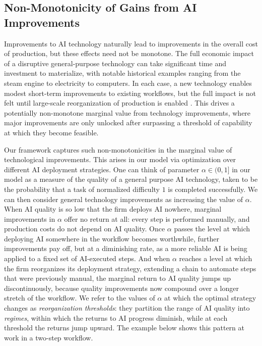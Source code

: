 \subsection{Non-Monotonicity of Gains from AI Improvements}
\label{sec:nonlinear}

Improvements to AI technology naturally lead to improvements in the overall cost of production, but these effects need not be monotone.
The full economic impact of a disruptive general-purpose technology can take significant time and investment to materialize, with notable historical examples ranging from the steam engine to electricity to computers.
In each case, a new technology enables modest short-term improvements to existing workflows, but the full impact is not felt until large-scale reorganization of production is enabled \citep{brynjolfsson2021productivity}.
This drives a potentially non-monotone marginal value from technology improvements, where major improvements are only unlocked after surpassing a threshold of capability at which they become feasible.

Our framework captures such non-monotonicities in the marginal value of technological improvements.
This arises in our model via optimization over different AI deployment strategies.
One can think of parameter $\alpha \in (0,1]$ in our model as a measure of the quality of a general purpose AI technology, taken to be the probability that a task of normalized difficulty $1$ is completed successfully.
We can then consider general technology improvements as increasing the value of $\alpha$.
When AI quality is so low that the firm deploys AI nowhere, marginal improvements in $\alpha$ offer no return at all: every step is performed manually, and production costs do not depend on AI quality.
Once $\alpha$ passes the level at which deploying AI somewhere in the workflow becomes worthwhile, further improvements pay off, but at a diminishing rate, as a more reliable AI is being applied to a fixed set of AI-executed steps.
And when $\alpha$ reaches a level at which the firm reorganizes its deployment strategy, extending a chain to automate steps that were previously manual, the marginal return to AI quality jumps up discontinuously, because quality improvements now compound over a longer stretch of the workflow.
We refer to the values of $\alpha$ at which the optimal strategy changes as \emph{reorganization thresholds}: they partition the range of AI quality into \emph{regimes}, within which the returns to AI progress diminish, while at each threshold the returns jump upward.
The example below shows this pattern at work in a two-step workflow.

